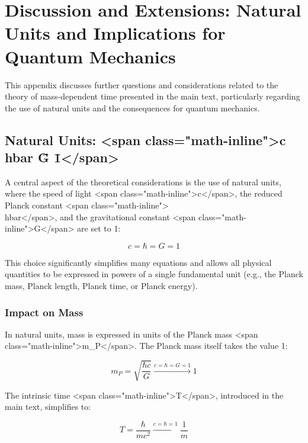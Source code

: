 \documentclass{article}
\begin{document}
\section{Discussion and Extensions: Natural Units and Implications for Quantum Mechanics}

This appendix discusses further questions and considerations related to the theory of mass-dependent time presented in the main text, particularly regarding the use of natural units and the consequences for quantum mechanics.

\subsection{Natural Units: <span class="math-inline">c \= \\hbar \= G \= 1</span>}

A central aspect of the theoretical considerations is the use of natural units, where the speed of light <span class="math-inline">c</span>, the reduced Planck constant <span class="math-inline">\\hbar</span>, and the gravitational constant <span class="math-inline">G</span> are set to 1:

\begin{equation}
	c = \hbar = G = 1
\end{equation}

This choice significantly simplifies many equations and allows all physical quantities to be expressed in powers of a single fundamental unit (e.g., the Planck mass, Planck length, Planck time, or Planck energy).

\subsubsection{Impact on Mass}

In natural units, mass is expressed in units of the Planck mass <span class="math-inline">m\_P</span>. The Planck mass itself takes the value 1:

\begin{equation}
	m_P = \sqrt{\frac{\hbar c}{G}} \xrightarrow{c=\hbar=G=1} 1
\end{equation}

The intrinsic time <span class="math-inline">T</span>, introduced in the main text, simplifies to:

\begin{equation}
	T = \frac{\hbar}{mc^2} \xrightarrow{c=\hbar=1} \frac{1}{m}
\end{equation}
\end{document}
